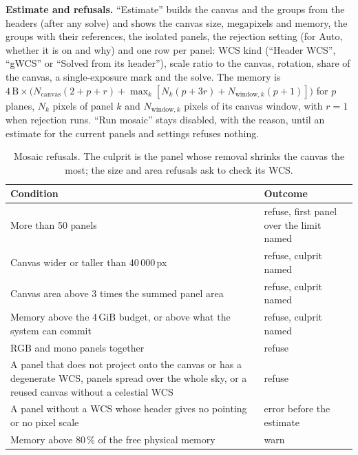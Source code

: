 \documentclass[11pt,a4paper]{article}
\begin{document}
    \textbf{Estimate and refusals.} ``Estimate'' builds the canvas and the groups from the headers (after any solve) and shows the canvas size, megapixels and memory, the groups with their references, the isolated panels, the rejection setting (for Auto, whether it is on and why) and one row per panel: WCS kind (``Header WCS'', ``gWCS'' or ``Solved from its header''), scale ratio to the canvas, rotation, share of the canvas, a single-exposure mark and the solve. The memory is $4\,\text{B} \times \big(N_{\text{canvas}}(2 + p + r) + \max_k [N_k (p + 3r) + N_{\text{window},k}(p + 1)]\big)$ for $p$ planes, $N_k$ pixels of panel $k$ and $N_{\text{window},k}$ pixels of its canvas window, with $r = 1$ when rejection runs. ``Run mosaic'' stays disabled, with the reason, until an estimate for the current panels and settings refuses nothing.

    \begin{table}[H]
        \centering
        \small
        \begin{tabularx}{\textwidth}{Xl}
            \toprule
            \textbf{Condition} & \textbf{Outcome} \\
            \midrule
            More than 50 panels & refuse, first panel over the limit named \\
            Canvas wider or taller than 40\,000\,px & refuse, culprit named \\
            Canvas area above 3 times the summed panel area & refuse, culprit named \\
            Memory above the 4\,GiB budget, or above what the system can commit & refuse, culprit named \\
            RGB and mono panels together & refuse \\
            A panel that does not project onto the canvas or has a degenerate WCS, panels spread over the whole sky, or a reused canvas without a celestial WCS & refuse \\
            A panel without a WCS whose header gives no pointing or no pixel scale & error before the estimate \\
            Memory above 80\,\% of the free physical memory & warn \\
            \bottomrule
        \end{tabularx}
        \caption{Mosaic refusals. The culprit is the panel whose removal shrinks the canvas the most; the size and area refusals ask to check its WCS.}
    \end{table}
\end{document}
